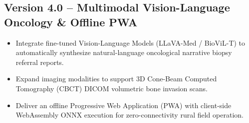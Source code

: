 \documentclass[12pt,a4paper,oneside]{report}
\begin{document}
\subsection{Version 4.0 -- Multimodal Vision-Language Oncology & Offline PWA}
\begin{itemize}
    \item Integrate fine-tuned Vision-Language Models (LLaVA-Med / BioViL-T) to automatically synthesize natural-language oncological narrative biopsy referral reports.
    \item Expand imaging modalities to support 3D Cone-Beam Computed Tomography (CBCT) DICOM volumetric bone invasion scans.
    \item Deliver an offline Progressive Web Application (PWA) with client-side WebAssembly ONNX execution for zero-connectivity rural field operation.
\end{itemize}



\end{document}
